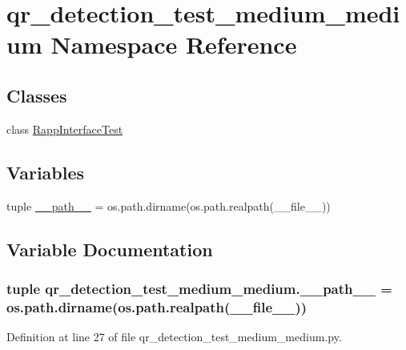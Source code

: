 \hypertarget{namespaceqr__detection__test__medium__medium}{\section{qr\-\_\-detection\-\_\-test\-\_\-medium\-\_\-medium Namespace Reference}
\label{namespaceqr__detection__test__medium__medium}
}
\subsection*{Classes}
\begin{DoxyCompactItemize}
\item 
class \hyperlink{classqr__detection__test__medium__medium_1_1RappInterfaceTest}{Rapp\-Interface\-Test}
\end{DoxyCompactItemize}
\subsection*{Variables}
\begin{DoxyCompactItemize}
\item 
tuple \hyperlink{namespaceqr__detection__test__medium__medium_a92281aa3bd923d6481b5af87332c3e5c}{\-\_\-\-\_\-path\-\_\-\-\_\-} = os.\-path.\-dirname(os.\-path.\-realpath(\-\_\-\-\_\-file\-\_\-\-\_\-))
\end{DoxyCompactItemize}


\subsection{Variable Documentation}
\hypertarget{namespaceqr__detection__test__medium__medium_a92281aa3bd923d6481b5af87332c3e5c}{
\subsubsection[{\-\_\-\-\_\-path\-\_\-\-\_\-}]{\setlength{\rightskip}{0pt plus 5cm}tuple qr\-\_\-detection\-\_\-test\-\_\-medium\-\_\-medium.\-\_\-\-\_\-path\-\_\-\-\_\- = os.\-path.\-dirname(os.\-path.\-realpath(\-\_\-\-\_\-file\-\_\-\-\_\-))}}\label{namespaceqr__detection__test__medium__medium_a92281aa3bd923d6481b5af87332c3e5c}


Definition at line 27 of file qr\-\_\-detection\-\_\-test\-\_\-medium\-\_\-medium.\-py.

